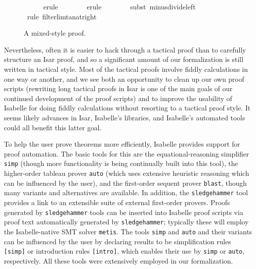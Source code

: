 \documentclass{article}
\theoremstyle{definition}
\begin{document}
\begin{figure}
\begin{isabellebody}
\ \ \ \ \isamarkupfalse%
\ {\isacharparenleft}erule\ {\isacharparenleft}{}{\isacharparenright}\ {}{\isacharparenright}\isanewline
\ \ \ \ \isamarkupfalse%
\ {\isacharparenleft}erule\ {\isacharparenleft}{}{\isacharparenright}\ {}{\isacharparenright}\isanewline
\ \ \ \ \isamarkupfalse%
\ {\isacharparenleft}subst\ minus{\isacharunderscore}divide{\isacharunderscore}left{\isacharparenright}{\isacharplus}\isanewline
\ \ \ \ \isamarkupfalse%
\ {\isacharparenleft}rule\ filterlim{\isacharunderscore}tan{\isacharunderscore}at{\isacharunderscore}right{\isacharparenright}\isanewline
{}\isamarkupfalse%
\end{isabellebody}
\caption{A mixed-style proof.}
\label{fig:mix}
\end{figure}

Nevertheless, often it is easier to hack through a tactical proof than to carefully structure an Isar proof, and so a significant amount of our formalization is still written in tactical style. Most of the tactical proofs involve fiddly calculations in one way or another, and we see both an opportunity to clean up our own proof scripts (rewriting long tactical proofs in Isar is one of the main goals of our continued development of the proof scripts) and to improve the usability of Isabelle for doing fiddly calculations without resorting to a tactical proof style. It seems likely advances in Isar, Isabelle's libraries, and Isabelle's automated tools could all benefit this latter goal.

To help the user prove theorems more efficiently, Isabelle provides support for proof automation. The basic tools for this are the equational-reasoning simplifier \texttt{simp} (though more functionality is being continually built into this tool), the higher-order tableau prover \texttt{auto} (which uses extensive heuristic reasoning which can be influenced by the user), and the first-order sequent prover \texttt{blast}, though many variants and alternatives are available. In addition, the \texttt{sledgehammer} tool \cite{paulson-sledgehammer} provides a link to an extensible suite of external first-order provers. Proofs generated by \texttt{sledgehammer} tools can be inserted into Isabelle proof scripts via proof text automatically generated by \texttt{sledgehammer}; typically these will employ the Isabelle-native SMT solver \texttt{metis}. The tools \texttt{simp} and \texttt{auto} and their variants can be influenced by the user by declaring results to be simplification rules \texttt{[simp]} or introduction rules \texttt{[intro]}, which enables their use by \texttt{simp} or \texttt{auto}, respectively. All these tools were extensively employed in our formalization.
\end{document}
